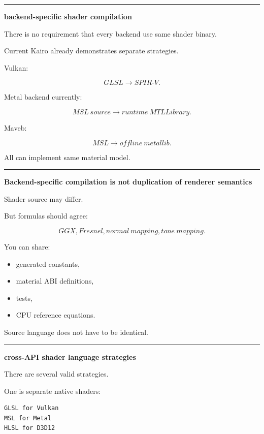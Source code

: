 \begin{center}\rule{0.5\linewidth}{0.5pt}\end{center}

\textbf{backend-specific shader compilation}

There is no requirement that every backend use same shader binary.

Current Kairo already demonstrates separate strategies.

Vulkan:

\[
GLSL
\rightarrow
SPIR\text{-}V.
\]

Metal backend currently:

\[
MSL\ source
\rightarrow
runtime\ MTLLibrary.
\]

Maveb:

\[
MSL
\rightarrow
offline\ metallib.
\]

All can implement same material model.

\begin{center}\rule{0.5\linewidth}{0.5pt}\end{center}

\textbf{Backend-specific compilation is not duplication of renderer semantics}

Shader source may differ.

But formulas should agree:

\[
GGX,
Fresnel,
normal\ mapping,
tone\ mapping.
\]

You can share:

\begin{itemize}
\tightlist
\item
  generated constants,
\item
  material ABI definitions,
\item
  tests,
\item
  CPU reference equations.
\end{itemize}

Source language does not have to be identical.

\begin{center}\rule{0.5\linewidth}{0.5pt}\end{center}

\textbf{cross-API shader language strategies}

There are several valid strategies.

One is separate native shaders:

\begin{verbatim}
GLSL for Vulkan
MSL for Metal
HLSL for D3D12
\end{verbatim}

